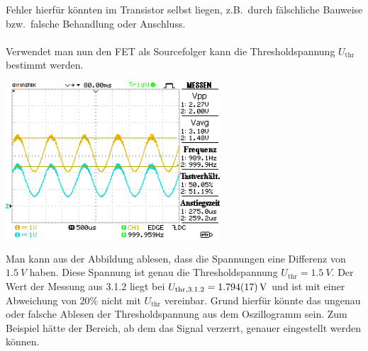 \documentclass[10pt]{article}
\newenvironment{Figure}
  {\par\medskip\noindent\minipage{\linewidth}}
  {\endminipage\par\medskip}
\begin{document}
\begin{multicols}{2}
        Fehler hierfür könnten im Transistor selbst liegen, z.B.\ durch fälschliche Bauweise bzw.\ falsche Behandlung oder Anschluss.\\\\
        Verwendet man nun den FET als Sourcefolger kann die Thresholdspannung $U_{\text{thr}}$ bestimmt werden.
        \begin{Figure}
                \centering
                \includegraphics[width=0.6\textwidth]{../data/DS0013.png}
        \end{Figure}
        Man kann aus der Abbildung ablesen, dass die Spannungen eine Differenz von $\SI{1.5}{V}$ haben.
        Diese Spannung ist genau die Thresholdspannung $U_{\text{thr}}=\SI{1.5}{V}$.
        Der Wert der Messung aus 3.1.2 liegt bei $U_{\text{thr},3.1.2}=\SI{1.794+-0.017}{V}$ und ist mit einer Abweichung von $20\%$ nicht mit $U_{\text{thr}}$ vereinbar.
        Grund hierfür könnte das ungenau oder falsche Ablesen der Thresholdspannung aus dem Oszillogramm sein.
        Zum Beispiel hätte der Bereich, ab dem das Signal verzerrt, genauer eingestellt werden können.


\end{multicols}
\end{document}
